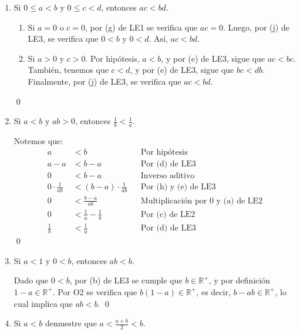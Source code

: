 \documentclass[11pt]{article}
\newcommand{\R}{\mathbb{R}}
\begin{document}
\begin{enumerate}[label=\alph*)]
    \item Si $0 \leq a<b$ y $0 \leq c<d$, entonces $ac<bd$.
    
    \begin{enumerate}[label=\roman*)]
        \item Si $a=0$ o $c=0$, por (g) de LE1 se verifica que $ac=0$. Luego, por (j) de LE3, se verifica que $0<b$ y $0<d$. Así, $ac<bd$.
        \item Si $a>0$ y $c>0$. Por hipótesis, $a<b$, y por (e) de LE3, sigue que $ac<bc$. También, tenemos que $c<d$, y por (e) de LE3, sigue que $bc<db$. Finalmente, por (j) de LE3, se verifica que $ac<bd$.
    \end{enumerate} \qed

    \item Si $a<b$ y $ab>0$, entonces $\frac{1}{b}<\frac{1}{a}$.
    
    Notemos que:
    \begin{align*}
    a &< b && \text{Por hipótesis} \\
    a-a &< b-a && \text{Por (d) de LE3} \\
    0 &< b-a && \text{Inverso aditivo} \\
    0 \cdot \frac{1}{ab} &< (b-a) \cdot \frac{1}{ab} && \text{Por (h) y (e) de LE3}\\
    0 &< \frac{b-a}{ab} && \text{Multiplicación por $0$ y (a) de LE2}\\
    0 &< \frac{1}{a} - \frac{1}{b} && \text{Por (c) de LE2}\\
    \frac{1}{b} &< \frac{1}{a} && \text{Por (d) de LE3}
    \end{align*} \qed

    \item Si $a<1$ y $0<b$, entonces $ab<b$.
    
    Dado que $0<b$, por (b) de LE3 se cumple que $b \in \R^+$, y por definición $1-a \in \R^+$. Por O2 se verifica que $b(1-a) \in \R^+$, es decir, $b-ab \in \R^+$, lo cual implica que $ab<b$. \qed

    \item Si $a<b$ demuestre que $a<\frac{a+b}{2}<b$.
    

\end{enumerate}
\end{document}
